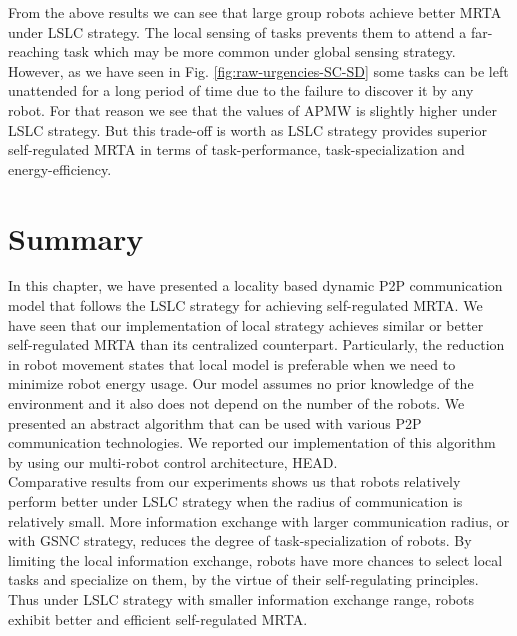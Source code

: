From the above results we can see that large group robots achieve better MRTA under LSLC strategy. The local sensing of tasks prevents them to attend a far-reaching task which may be more common under global sensing strategy. However, as we have seen in Fig. \ref{fig:raw-urgencies-SC-SD}
some tasks can be left unattended for a long period of time due to the failure to discover it by any robot. For that reason we see that the values of APMW is slightly higher under LSLC strategy. But this trade-off is worth as LSLC strategy provides superior self-regulated MRTA in terms of task-performance, task-specialization and energy-efficiency.
\section{Summary}
\label{loacl-comm:summary}
In this chapter, we have presented a locality based dynamic P2P communication model that follows the LSLC strategy for achieving self-regulated MRTA. We have seen that our implementation of local strategy achieves similar or better self-regulated MRTA than its centralized counterpart. Particularly, the reduction in robot movement states that local model is preferable when we need to minimize robot energy usage. Our model assumes no prior knowledge of the environment and it also does not depend on the number of the robots. We presented an abstract algorithm that can be used with various P2P communication technologies. We reported our implementation of this algorithm by using our multi-robot control architecture, HEAD.\\
Comparative results from our experiments shows us that robots relatively perform better under LSLC strategy when the radius of communication is relatively small. More information exchange with larger communication radius, or with GSNC strategy, reduces the degree of task-specialization of robots. By limiting the local information exchange, robots have more chances to select local tasks and specialize on them, by the virtue of their self-regulating principles. Thus under LSLC strategy with smaller information exchange range, robots exhibit better and efficient self-regulated MRTA.